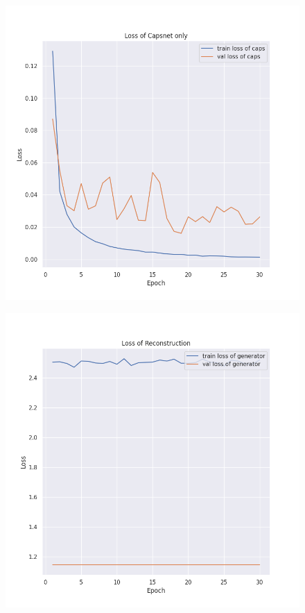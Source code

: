 \begin{figure}
    \centering
    \begin{minipage}{.5\textwidth}
      \centering
      \includegraphics[trim={2cm 0 2cm 0},clip,width=.65\linewidth]{images/chapter experiments/method 3/rowls/loss_only_capsnet_good.png}
      \captionsetup{width=0.8\linewidth}
      \label{fig:method3_rowls_left}
    \end{minipage}%
    \begin{minipage}{.45\textwidth}
      \centering
      \includegraphics[trim={2cm 0 2cm 0},clip,width=.73\linewidth]{images/chapter experiments/method 3/rowls/loss_only_reconstruction_good.png}
      \captionsetup{width=0.8\linewidth}
      \label{fig:method3_rowls_right}
    \end{minipage}
    \end{figure}

